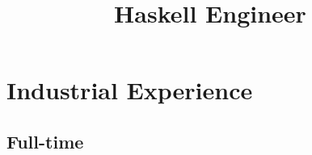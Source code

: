 \documentclass[11pt,a4paper,roman]{moderncv}
\title{Haskell Engineer}
\begin{document}
\makecvtitle



\newcommand\seeabovedesc{(\textit{See description above.})}

\newcommand\altamont{Altamont, Tennessee, USA}
\newcommand\austin{Austin, Texas, USA}
\newcommand\centurion{Centurion, South Africa}
\newcommand\chattanooga{Chattanooga, Tennessee, USA}
\newcommand\chippewafalls{Chippewa Falls, Wisconsin, USA}
\newcommand\london{London, UK}
\newcommand\portland{Portland, Oregon, USA}
\newcommand\pretoria{Pretoria, South Africa}
\newcommand\sanfrancisco{San Francisco, California, USA}
\newcommand\stlouis{St. Louis, Missouri, USA}
\newcommand\utrecht{Utrecht, The Netherlands}
\newcommand\whitemarsh{White Marsh, Maryland, USA}

\newcommand\uu{Utrecht University}
\newcommand\wustl{Washington University in St. Louis}
\newcommand\ut{University of Texas at Austin}



\newcommand\Cpp{C{}\texttt{++}\xspace}


\section{Industrial Experience}


\subsection{Full-time}
\end{document}
